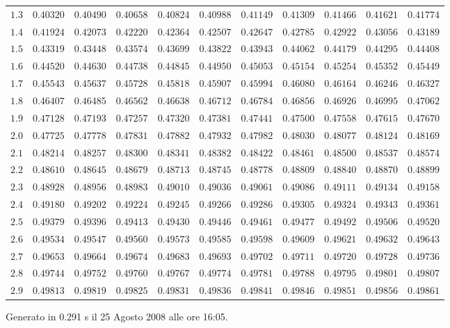 \begin{table}[htb!]
\begin{center}
{\begin{tabular}{p{22 pt}cccccccccc}
$1.3$ & $0.40320$ & $0.40490$ & $0.40658$ & $0.40824$ & $0.40988$ & $0.41149$ & $0.41309$ & $0.41466$ & $0.41621$ & $0.41774$\\
$1.4$ & $0.41924$ & $0.42073$ & $0.42220$ & $0.42364$ & $0.42507$ & $0.42647$ & $0.42785$ & $0.42922$ & $0.43056$ & $0.43189$\\
$1.5$ & $0.43319$ & $0.43448$ & $0.43574$ & $0.43699$ & $0.43822$ & $0.43943$ & $0.44062$ & $0.44179$ & $0.44295$ & $0.44408$\\
$1.6$ & $0.44520$ & $0.44630$ & $0.44738$ & $0.44845$ & $0.44950$ & $0.45053$ & $0.45154$ & $0.45254$ & $0.45352$ & $0.45449$\\
$1.7$ & $0.45543$ & $0.45637$ & $0.45728$ & $0.45818$ & $0.45907$ & $0.45994$ & $0.46080$ & $0.46164$ & $0.46246$ & $0.46327$\\
$1.8$ & $0.46407$ & $0.46485$ & $0.46562$ & $0.46638$ & $0.46712$ & $0.46784$ & $0.46856$ & $0.46926$ & $0.46995$ & $0.47062$\\
$1.9$ & $0.47128$ & $0.47193$ & $0.47257$ & $0.47320$ & $0.47381$ & $0.47441$ & $0.47500$ & $0.47558$ & $0.47615$ & $0.47670$\\
$2.0$ & $0.47725$ & $0.47778$ & $0.47831$ & $0.47882$ & $0.47932$ & $0.47982$ & $0.48030$ & $0.48077$ & $0.48124$ & $0.48169$\\
$2.1$ & $0.48214$ & $0.48257$ & $0.48300$ & $0.48341$ & $0.48382$ & $0.48422$ & $0.48461$ & $0.48500$ & $0.48537$ & $0.48574$\\
$2.2$ & $0.48610$ & $0.48645$ & $0.48679$ & $0.48713$ & $0.48745$ & $0.48778$ & $0.48809$ & $0.48840$ & $0.48870$ & $0.48899$\\
$2.3$ & $0.48928$ & $0.48956$ & $0.48983$ & $0.49010$ & $0.49036$ & $0.49061$ & $0.49086$ & $0.49111$ & $0.49134$ & $0.49158$\\
$2.4$ & $0.49180$ & $0.49202$ & $0.49224$ & $0.49245$ & $0.49266$ & $0.49286$ & $0.49305$ & $0.49324$ & $0.49343$ & $0.49361$\\
$2.5$ & $0.49379$ & $0.49396$ & $0.49413$ & $0.49430$ & $0.49446$ & $0.49461$ & $0.49477$ & $0.49492$ & $0.49506$ & $0.49520$\\
$2.6$ & $0.49534$ & $0.49547$ & $0.49560$ & $0.49573$ & $0.49585$ & $0.49598$ & $0.49609$ & $0.49621$ & $0.49632$ & $0.49643$\\
$2.7$ & $0.49653$ & $0.49664$ & $0.49674$ & $0.49683$ & $0.49693$ & $0.49702$ & $0.49711$ & $0.49720$ & $0.49728$ & $0.49736$\\
$2.8$ & $0.49744$ & $0.49752$ & $0.49760$ & $0.49767$ & $0.49774$ & $0.49781$ & $0.49788$ & $0.49795$ & $0.49801$ & $0.49807$\\
$2.9$ & $0.49813$ & $0.49819$ & $0.49825$ & $0.49831$ & $0.49836$ & $0.49841$ & $0.49846$ & $0.49851$ & $0.49856$ & $0.49861$\\
\hline

\end{tabular}
}
\end{center}
\end{table}
\vfill
\hfill {\scriptsize Generato in 0.291 s il 25 Agosto 2008 alle ore 16:05.}
